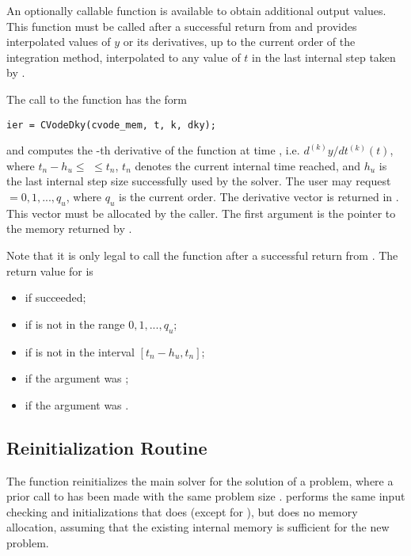 An optionally callable function  is available
to obtain additional output values.  This function must be called after a successful
return from  and provides interpolated values of $y$ or its derivatives, 
up to the current order of the integration method, interpolated to any value of $t$ 
in the last internal step taken by {\cvodes}.

The call to the  function has the form
\begin{verbatim}
ier = CVodeDky(cvode_mem, t, k, dky);
\end{verbatim}
and computes the -th derivative of the  function at      
time , i.e. $d^{(k)}y/dt^{(k)} (t)$, where $t_n - h_u \le$  $\le t_n$, 
$t_n$ denotes the current internal time reached, and $h_u$ is the 
last internal step size successfully used by the solver. 
The user may request  $= 0, 1, ..., q_u$, where $q_u$ is the 
current order. The derivative vector is returned in . 
This vector must be allocated by the caller. 
The first argument  is the pointer to the {\cvodes}
memory returned by .

Note that it is only legal to call the function  after a 
successful return from .
The return value  for  is
\begin{itemize}
\item {} if  succeeded;
\item {} if  is not in the range $0, 1, ..., q_u$;
\item {} if  is not in the interval $[t_n - h_u , t_n]$;
\item {} if the  argument was ;
\item {} if the  argument was .
\end{itemize}

\subsection{{\cvodes} Reinitialization Routine}\label{sss:cvreinit}

The function  reinitializes the main {\cvodes} solver for
the solution of a problem, where a prior call to  has
been made with the same problem size .  performs the 
same input checking and initializations that  does 
(except for ), but does no memory allocation, assuming that the 
existing internal memory is sufficient for the new problem.             
                                                                 
